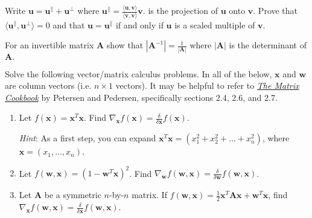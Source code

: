 \documentclass{harvardml}
\theoremstyle{definition}
\theoremstyle{plain}
\renewcommand{\v}[1]{\mathbf{#1}}
\begin{document}
\begin{problem}
        Write $\mathbf{u} = \mathbf{u}^\parallel + \mathbf{u^\perp}$ where $\mathbf{u}^\parallel = \frac{\langle \v u, \v v \rangle}
				{\langle \v v, \v v \rangle} \v v$. is the projection of $\v u$ onto $\v v$. Prove that $\langle \mathbf{u}^\parallel,
		\mathbf{u^\perp} \rangle = 0$ and that $\v u = \mathbf{u}^\parallel$ if and only if $\v u$ is a scaled multiple of $\v v$.
        \end{problem}


\begin{problem}
	For an invertible matrix $\mathbf{A}$ show that $|\mathbf{A}^{-1}| = \frac{1}{|\mathbf A|}$ where $|\mathbf A|$ is the determinant of $\mathbf{A}.$
\end{problem}
        

\begin{problem} 
	Solve the following vector/matrix calculus problems. In all of the below, $\mathbf{x}$ and $\mathbf{w}$ are column vectors (i.e. $n \times 1$ vectors).  It may be helpful to refer to \href{https://www.math.uwaterloo.ca/~hwolkowi/matrixcookbook.pdf}{\emph{The Matrix Cookbook}} by Petersen and Pedersen, specifically sections 2.4, 2.6, and 2.7.
	
	\begin{enumerate} [label=(\alph*)]
		\item Let $f(\mathbf{x}) = \mathbf{x}^T \mathbf{x}$. Find $\nabla_{\mathbf{x}} f(\mathbf{x}) = \frac{\delta}{\delta \mathbf{x}} f(\mathbf{x})$.
		
		\emph{Hint}: As a first step, you can expand $\mathbf{x}^T \mathbf{x} = (x_1^2 + x_2^2 + ... + x_n^2)$, where $\mathbf{x} = (x_1, ..., x_n)$. 
		
		\item Let $f(\mathbf{w},\mathbf{x}) = (1 - \mathbf{w}^T \mathbf{x})^2$. Find $\nabla_{\mathbf{w}} f(\mathbf{w},\mathbf{x}) = \frac{\delta}{\delta \mathbf{w}} f(\mathbf{w},\mathbf{x})$.
		
		\item Let $\mathbf{A}$ be a symmetric $n$-by-$n$ matrix. If $f(\mathbf{w},\mathbf{x}) = \frac{1}{2}\mathbf{x}^T \mathbf{A} \mathbf{x} + \mathbf{w}^T \mathbf{x}$, find $\nabla_{\mathbf{x}} f(\mathbf{w},\mathbf{x}) = \frac{\delta}{\delta \mathbf{x}} f(\mathbf{w},\mathbf{x})$.
		\end{enumerate}
\end{problem}
\end{document}
